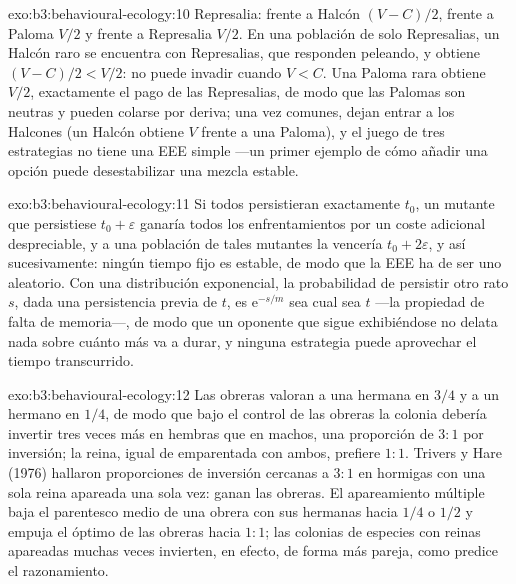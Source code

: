 \begin{solution}{exo:b3:behavioural-ecology:10}
Represalia: frente a Halcón $(V - C)/2$, frente a Paloma $V/2$ y frente
a Represalia $V/2$. En una población de solo Represalias, un Halcón raro
se encuentra con Represalias, que responden peleando, y obtiene
$(V - C)/2 < V/2$: no puede invadir cuando $V < C$. Una Paloma rara
obtiene $V/2$, exactamente el pago de las Represalias, de modo que las
Palomas son neutras y pueden colarse por deriva; una vez comunes, dejan
entrar a los Halcones (un Halcón obtiene $V$ frente a una Paloma), y el
juego de tres estrategias no tiene una EEE simple ---un primer ejemplo
de cómo añadir una opción puede desestabilizar una mezcla estable.
\end{solution}

\begin{solution}{exo:b3:behavioural-ecology:11}
Si todos persistieran exactamente $t_{0}$, un mutante que persistiese
$t_{0} +
\varepsilon$ ganaría todos los enfrentamientos por un coste adicional
despreciable, y a una población de tales mutantes la vencería
$t_{0} + 2\varepsilon$, y así sucesivamente: ningún tiempo fijo es
estable, de modo que la EEE ha de ser uno aleatorio. Con una
distribución exponencial, la probabilidad de persistir otro rato $s$,
dada una persistencia previa de $t$, es $\mathrm{e}^{-s/m}$ sea cual sea
$t$ ---la propiedad de falta de memoria---, de modo que un oponente que
sigue exhibiéndose no delata nada sobre cuánto más va a durar, y
ninguna estrategia puede aprovechar el tiempo transcurrido.
\end{solution}

\begin{solution}{exo:b3:behavioural-ecology:12}
Las obreras valoran a una hermana en $3/4$ y a un hermano en $1/4$, de
modo que bajo el control de las obreras la colonia debería invertir tres
veces más en hembras que en machos, una proporción de $3{:}1$ por
inversión; la reina, igual de emparentada con ambos, prefiere $1{:}1$.
Trivers y Hare (1976) hallaron proporciones de inversión cercanas a
$3{:}1$ en hormigas con una sola reina apareada una sola vez: ganan las
obreras. El apareamiento múltiple baja el parentesco medio de una obrera
con sus hermanas hacia $1/4$ o $1/2$ y empuja el óptimo de las obreras
hacia $1{:}1$; las colonias de especies con reinas apareadas muchas
veces invierten, en efecto, de forma más pareja, como predice el
razonamiento.
\end{solution}

